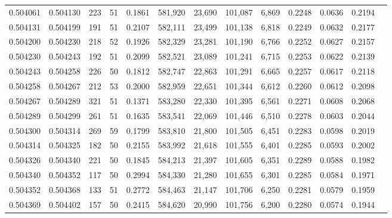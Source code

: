 \begin{tabular}{rrrrrrrrrrrrr}
0.504061 & 0.504130 & 223 &  51 &                                     0.1861 & 581,920 &  23,690 & 101,087 &   6,869 & 0.2248 & 0.0636 & 0.2194 \\
0.504131 & 0.504199 & 191 &  51 &                                     0.2107 & 582,111 &  23,499 & 101,138 &   6,818 & 0.2249 & 0.0632 & 0.2177 \\
0.504200 & 0.504230 & 218 &  52 &                                     0.1926 & 582,329 &  23,281 & 101,190 &   6,766 & 0.2252 & 0.0627 & 0.2157 \\
0.504230 & 0.504243 & 192 &  51 &                                     0.2099 & 582,521 &  23,089 & 101,241 &   6,715 & 0.2253 & 0.0622 & 0.2139 \\
0.504243 & 0.504258 & 226 &  50 &                                     0.1812 & 582,747 &  22,863 & 101,291 &   6,665 & 0.2257 & 0.0617 & 0.2118 \\
0.504258 & 0.504267 & 212 &  53 &                                     0.2000 & 582,959 &  22,651 & 101,344 &   6,612 & 0.2260 & 0.0612 & 0.2098 \\
0.504267 & 0.504289 & 321 &  51 &                                     0.1371 & 583,280 &  22,330 & 101,395 &   6,561 & 0.2271 & 0.0608 & 0.2068 \\
0.504289 & 0.504299 & 261 &  51 &                                     0.1635 & 583,541 &  22,069 & 101,446 &   6,510 & 0.2278 & 0.0603 & 0.2044 \\
0.504300 & 0.504314 & 269 &  59 &                                     0.1799 & 583,810 &  21,800 & 101,505 &   6,451 & 0.2283 & 0.0598 & 0.2019 \\
0.504314 & 0.504325 & 182 &  50 &                                     0.2155 & 583,992 &  21,618 & 101,555 &   6,401 & 0.2285 & 0.0593 & 0.2002 \\
0.504326 & 0.504340 & 221 &  50 &                                     0.1845 & 584,213 &  21,397 & 101,605 &   6,351 & 0.2289 & 0.0588 & 0.1982 \\
0.504340 & 0.504352 & 117 &  50 &                                     0.2994 & 584,330 &  21,280 & 101,655 &   6,301 & 0.2285 & 0.0584 & 0.1971 \\
0.504352 & 0.504368 & 133 &  51 &                                     0.2772 & 584,463 &  21,147 & 101,706 &   6,250 & 0.2281 & 0.0579 & 0.1959 \\
0.504369 & 0.504402 & 157 &  50 &                                     0.2415 & 584,620 &  20,990 & 101,756 &   6,200 & 0.2280 & 0.0574 & 0.1944 \\

\end{tabular}
